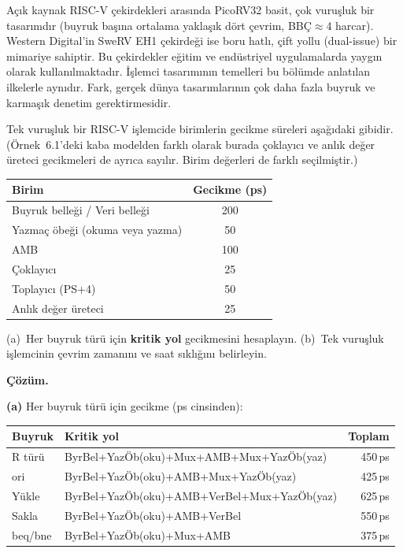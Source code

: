 \begin{bilginot}
Açık kaynak RISC-V çekirdekleri arasında PicoRV32 basit, çok vuruşluk bir tasarımdır (buyruk başına ortalama yaklaşık dört çevrim, BBÇ$\approx$4 harcar). Western Digital'in SweRV EH1 çekirdeği ise boru hatlı, çift yollu (dual-issue) bir mimariye sahiptir. Bu çekirdekler eğitim ve endüstriyel uygulamalarda yaygın olarak kullanılmaktadır. İşlemci tasarımının temelleri bu bölümde anlatılan ilkelerle aynıdır. Fark, gerçek dünya tasarımlarının çok daha fazla buyruk ve karmaşık denetim gerektirmesidir.
\end{bilginot}

\begin{ornek}[6.4]
Tek vuruşluk bir RISC-V işlemcide birimlerin gecikme süreleri aşağıdaki gibidir. (Örnek~6.1'deki kaba modelden farklı olarak burada çoklayıcı ve anlık değer üreteci gecikmeleri de ayrıca sayılır. Birim değerleri de farklı seçilmiştir.)

\begin{center}
\begin{tabular}{lc}
\toprule
\textbf{Birim} & \textbf{Gecikme (ps)} \\
\midrule
Buyruk belleği / Veri belleği & 200 \\
Yazmaç öbeği (okuma veya yazma) & 50 \\
AMB & 100 \\
Çoklayıcı & 25 \\
Toplayıcı (PS+4) & 50 \\
Anlık değer üreteci & 25 \\
\bottomrule
\end{tabular}
\end{center}

(a)~Her buyruk türü için \textbf{kritik yol} gecikmesini hesaplayın. (b)~Tek vuruşluk işlemcinin çevrim zamanını ve saat sıklığını belirleyin.

\textbf{Çözüm.}

\textbf{(a)} Her buyruk türü için gecikme (ps cinsinden):

\begin{center}
\small
\begin{tabular}{@{}lp{7cm}r@{}}
\toprule
\textbf{Buyruk} & \textbf{Kritik yol} & \textbf{Toplam} \\
\midrule
R türü & ByrBel+YazÖb(oku)+Mux+AMB+Mux+YazÖb(yaz) & 450\,ps \\
ori & ByrBel+YazÖb(oku)+AMB+Mux+YazÖb(yaz) & 425\,ps \\
Yükle & ByrBel+YazÖb(oku)+AMB+VerBel+Mux+YazÖb(yaz) & 625\,ps \\
Sakla & ByrBel+YazÖb(oku)+AMB+VerBel & 550\,ps \\
beq/bne & ByrBel+YazÖb(oku)+Mux+AMB & 375\,ps \\
\bottomrule
\end{tabular}
\end{center}


\end{ornek}
